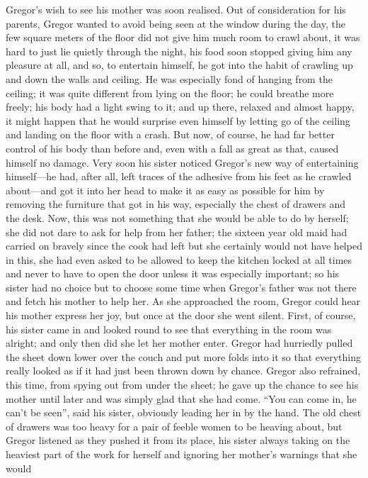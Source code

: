 Gregor’s wish to see his mother was soon realised. Out of consideration
for his parents, Gregor wanted to avoid being seen at the window during
the day, the few square meters of the floor did not give him much room
to crawl about, it was hard to just lie quietly through the night, his
food soon stopped giving him any pleasure at all, and so, to entertain
himself, he got into the habit of crawling up and down the walls and
ceiling. He was especially fond of hanging from the ceiling; it was
quite different from lying on the floor; he could breathe more freely;
his body had a light swing to it; and up there, relaxed and almost
happy, it might happen that he would surprise even himself by letting
go of the ceiling and landing on the floor with a crash. But now, of
course, he had far better control of his body than before and, even
with a fall as great as that, caused himself no damage. Very soon his
sister noticed Gregor’s new way of entertaining himself—he had, after
all, left traces of the adhesive from his feet as he crawled about—and
got it into her head to make it as easy as possible for him by removing
the furniture that got in his way, especially the chest of drawers and
the desk. Now, this was not something that she would be able to do by
herself; she did not dare to ask for help from her father; the sixteen
year old maid had carried on bravely since the cook had left but she
certainly would not have helped in this, she had even asked to be
allowed to keep the kitchen locked at all times and never to have to
open the door unless it was especially important; so his sister had no
choice but to choose some time when Gregor’s father was not there and
fetch his mother to help her. As she approached the room, Gregor could
hear his mother express her joy, but once at the door she went silent.
First, of course, his sister came in and looked round to see that
everything in the room was alright; and only then did she let her
mother enter. Gregor had hurriedly pulled the sheet down lower over the
couch and put more folds into it so that everything really looked as if
it had just been thrown down by chance. Gregor also refrained, this
time, from spying out from under the sheet; he gave up the chance to
see his mother until later and was simply glad that she had come. “You
can come in, he can’t be seen”, said his sister, obviously leading her
in by the hand. The old chest of drawers was too heavy for a pair of
feeble women to be heaving about, but Gregor listened as they pushed it
from its place, his sister always taking on the heaviest part of the
work for herself and ignoring her mother’s warnings that she would
